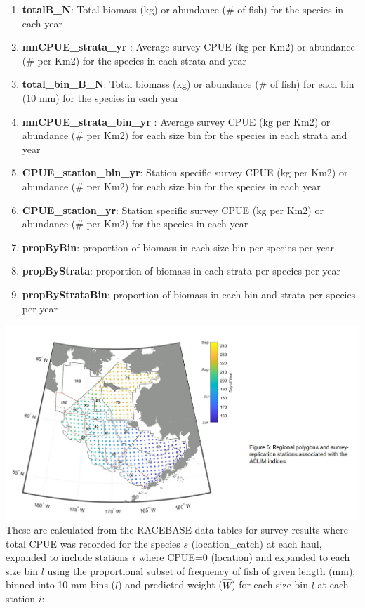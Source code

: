 \documentclass[
]{article}
\providecommand{\tightlist}{%
  \setlength{\itemsep}{0pt}\setlength{\parskip}{0pt}}
\begin{document}
\begin{enumerate}
\def\labelenumi{\arabic{enumi}.}
\tightlist
\item
  \textbf{totalB\_N}: Total biomass (kg) or abundance (\# of fish) for
  the species in each year\\
\item
  \textbf{mnCPUE\_strata\_yr} : Average survey CPUE (kg per Km2) or
  abundance (\# per Km2) for the species in each strata and year\\
\item
  \textbf{total\_bin\_B\_N}: Total biomass (kg) or abundance (\# of
  fish) for each bin (10 mm) for the species in each year\\
\item
  \textbf{mnCPUE\_strata\_bin\_yr} : Average survey CPUE (kg per Km2) or
  abundance (\# per Km2) for each size bin for the species in each
  strata and year
\item
  \textbf{CPUE\_station\_bin\_yr}: Station specific survey CPUE (kg per
  Km2) or abundance (\# per Km2) for each size bin for the species in
  each year\\
\item
  \textbf{CPUE\_station\_yr}: Station specific survey CPUE (kg per Km2)
  or abundance (\# per Km2) for the species in each year\\
\item
  \textbf{propByBin}: proportion of biomass in each size bin per species
  per year\\
\item
  \textbf{propByStrata}: proportion of biomass in each strata per
  species per year
\item
  \textbf{propByStrataBin}: proportion of biomass in each bin and strata
  per species per year
\end{enumerate}

\includegraphics{figs/Kearney_2023.jpg} These are calculated from the
RACEBASE data tables for survey results where total CPUE was recorded
for the species \(s\) (location\_catch) at each haul, expanded to
include stations \(i\) where CPUE=0 (location) and expanded to each size
bin \(l\) using the proportional subset of frequency of fish of given
length (mm), binned into 10 mm bins (\(l\)) and predicted weight
(\(\hat{W}\)) for each size bin \(l\) at each station \(i\):
\end{document}
